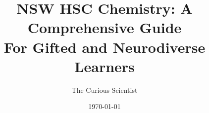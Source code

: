 \documentclass[justified]{tufte-book}
\title{NSW HSC Chemistry: A Comprehensive Guide\\
\large For Gifted and Neurodiverse Learners}
\author{The Curious Scientist}
\date{\today}
\begin{document}
\maketitle


\FloatBarrier


\FloatBarrier


\FloatBarrier


\FloatBarrier


\FloatBarrier


\FloatBarrier


\FloatBarrier


\FloatBarrier


\FloatBarrier
\end{document}
